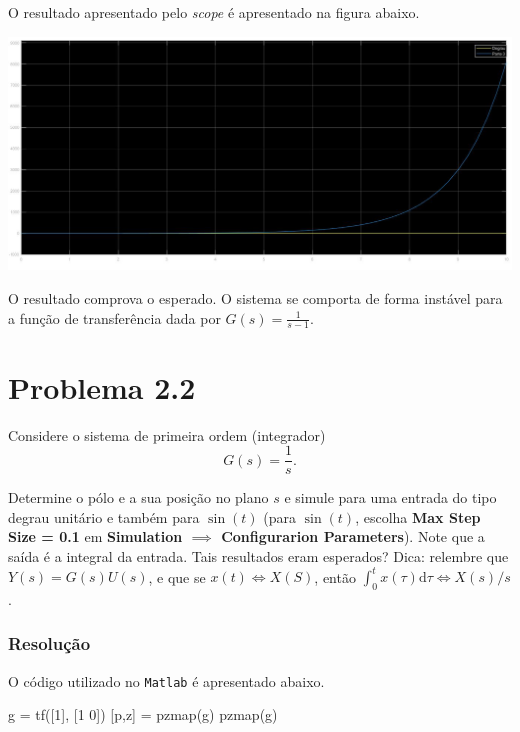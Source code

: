 \documentclass[
]{book}
\newenvironment{Shaded}{\begin{snugshade}}{\end{snugshade}}
\newcommand{\FloatTok}[1]{\textcolor[rgb]{0.00,0.00,0.81}{#1}}
\newcommand{\NormalTok}[1]{#1}
\theoremstyle{definition}
\theoremstyle{definition}
\theoremstyle{definition}
\theoremstyle{remark}
\begin{document}
O resultado apresentado pelo \emph{scope} é apresentado na figura abaixo.

\includegraphics{Imagens/Lab2/resultSim2.jpg}

O resultado comprova o esperado. O sistema se comporta de forma instável para a função de transferência dada por \(G(s) = \frac {1}{s-1}\).

\hypertarget{problema-2.2}{%
\section*{Problema 2.2}\label{problema-2.2}}

Considere o sistema de primeira ordem (integrador)
\[
G(s) = \frac {1}{s}.
\]

Determine o pólo e a sua posição no plano \(s\) e simule para uma entrada do tipo degrau unitário e também para \(\sin {(t)}\) (para \(\sin {(t)}\), escolha \textbf{Max Step Size = 0.1} em \textbf{Simulation \(\implies\) Configurarion Parameters}). Note que a saída é a integral da entrada. Tais resultados eram esperados? Dica: relembre que \(Y(s) = G(s)U(s)\), e que se \(x(t) \iff X(S)\), então \(\int_0^t x(\tau) \mathrm{d}\tau \iff X(s)/s\).

\hypertarget{resoluuxe7uxe3o-1}{%
\subsubsection*{Resolução}\label{resoluuxe7uxe3o-1}}

O código utilizado no \texttt{Matlab} é apresentado abaixo.

\begin{Shaded}
\begin{Highlighting}[]
\NormalTok{g = tf([}\FloatTok{1}\NormalTok{], [}\FloatTok{1} \FloatTok{0}\NormalTok{])}
\NormalTok{[p,z] = pzmap(g)}
\NormalTok{pzmap(g)}
\end{Highlighting}
\end{Shaded}
\end{document}
